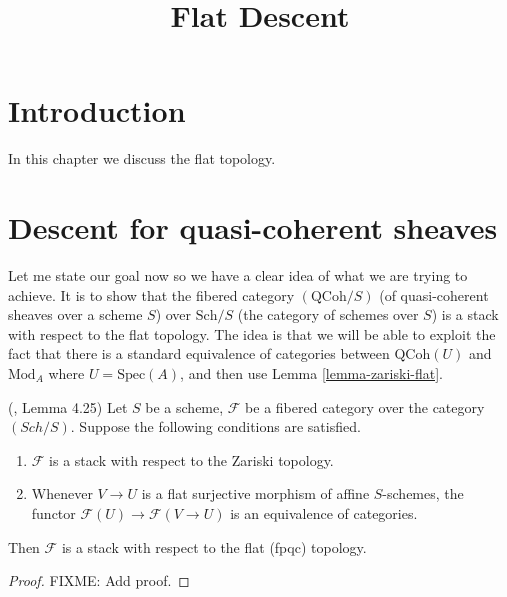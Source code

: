 

%


\title{Flat Descent}

\maketitle

\label{section-phantom}

\tableofcontents

\section{Introduction}
\label{section-introduction}

\noindent
In this chapter we discuss the flat topology.

\section{Descent for quasi-coherent sheaves}
\label{section-equivalence}

\noindent
Let me state our goal now so we have a clear idea of what we are
trying to achieve. It is to show that the fibered category $(\text{QCoh}/S)$
(of quasi-coherent sheaves over a scheme $S$) over $\text{Sch}/S$ (the
category of schemes over $S$) is a stack with respect to the flat
topology.  The idea is that we will be able to exploit the fact that
there is a standard equivalence of categories between $\text{QCoh}(U)$ and
$\text{Mod}_A$ where $U = \text{Spec}(A)$, and then use Lemma
\ref{lemma-zariski-flat}.

\begin{lemma}
\label{lemma-zariski-flat}
(\cite{Vis2}, Lemma 4.25)
Let $S$ be a scheme, $\mathcal F$ be a fibered category over the
category $(Sch/S)$.  Suppose the following conditions are satisfied.
\begin{enumerate}
\item $\mathcal F$ is a stack with respect to the Zariski topology.
\item Whenever $V \rightarrow U$ is a flat surjective morphism of affine
$S$-schemes, the functor
$\mathcal F(U) \rightarrow  \mathcal F(V \rightarrow U)$ is an equivalence of
categories.
\end{enumerate}
Then $\mathcal F$ is a stack with respect to the flat (fpqc) topology.	
\end{lemma}
\begin{proof}
FIXME: Add proof.
\end{proof}

